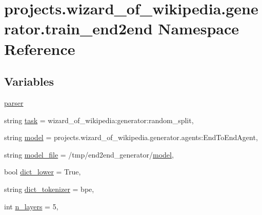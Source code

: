 \hypertarget{namespaceprojects_1_1wizard__of__wikipedia_1_1generator_1_1train__end2end}{}\section{projects.\+wizard\+\_\+of\+\_\+wikipedia.\+generator.\+train\+\_\+end2end Namespace Reference}
\label{namespaceprojects_1_1wizard__of__wikipedia_1_1generator_1_1train__end2end}
\subsection*{Variables}
\begin{DoxyCompactItemize}
\item 
\hyperlink{namespaceprojects_1_1wizard__of__wikipedia_1_1generator_1_1train__end2end_aad25450de311c4a13fa026e688e4040c}{parser}
\item 
string \hyperlink{namespaceprojects_1_1wizard__of__wikipedia_1_1generator_1_1train__end2end_a34c602ba2ad0247c28d9f13a9892a30f}{task} = \textquotesingle{}wizard\+\_\+of\+\_\+wikipedia\+:generator\+:random\+\_\+split\textquotesingle{},
\item 
string \hyperlink{namespaceprojects_1_1wizard__of__wikipedia_1_1generator_1_1train__end2end_a88bc9629da6416e5319f1a071319d75a}{model} = \textquotesingle{}projects.\+wizard\+\_\+of\+\_\+wikipedia.\+generator.\+agents\+:\+End\+To\+End\+Agent\textquotesingle{},
\item 
string \hyperlink{namespaceprojects_1_1wizard__of__wikipedia_1_1generator_1_1train__end2end_ad434e3e8d0b298780fb6b98a1a80abc9}{model\+\_\+file} = \textquotesingle{}/tmp/end2end\+\_\+generator/\hyperlink{namespaceprojects_1_1wizard__of__wikipedia_1_1generator_1_1train__end2end_a88bc9629da6416e5319f1a071319d75a}{model}\textquotesingle{},
\item 
bool \hyperlink{namespaceprojects_1_1wizard__of__wikipedia_1_1generator_1_1train__end2end_a58640cb8d5776f08d383394674dc108b}{dict\+\_\+lower} = True,
\item 
string \hyperlink{namespaceprojects_1_1wizard__of__wikipedia_1_1generator_1_1train__end2end_a2c6dc5758206b727acff29554fe050d6}{dict\+\_\+tokenizer} = \textquotesingle{}bpe\textquotesingle{},
\item 
int \hyperlink{namespaceprojects_1_1wizard__of__wikipedia_1_1generator_1_1train__end2end_abfad330d0c7c014b2d6a5424a4e973ce}{n\+\_\+layers} = 5,

\end{DoxyCompactItemize}
